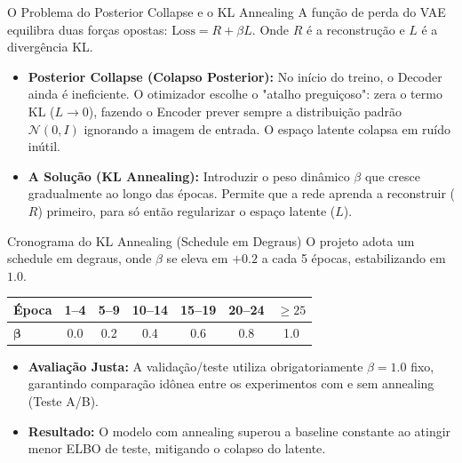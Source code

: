 \documentclass[10pt,aspectratio=169]{beamer}
\begin{document}
\begin{frame}{O Problema do Posterior Collapse e o KL Annealing}
    A função de perda do VAE equilibra duas forças opostas: $\text{Loss} = R + \beta L$. Onde $R$ é a reconstrução e $L$ é a divergência KL.
    \vspace{0.2cm}
    \begin{itemize}
        \item \textbf{Posterior Collapse (Colapso Posterior):} No início do treino, o Decoder ainda é ineficiente. O otimizador escolhe o "atalho preguiçoso": zera o termo KL ($L \to 0$), fazendo o Encoder prever sempre a distribuição padrão $\mathcal{N}(0, I)$ ignorando a imagem de entrada. O espaço latente colapsa em ruído inútil.
        \item \textbf{A Solução (KL Annealing):} Introduzir o peso dinâmico $\beta$ que cresce gradualmente ao longo das épocas. Permite que a rede aprenda a reconstruir ($R$) primeiro, para só então regularizar o espaço latente ($L$).
    \end{itemize}
\end{frame}

\begin{frame}{Cronograma do KL Annealing (Schedule em Degraus)}
    O projeto adota um schedule em degraus, onde $\beta$ se eleva em $+0.2$ a cada 5 épocas, estabilizando em $1.0$.
    \vspace{0.3cm}
    \begin{table}[]
        \centering
        \begin{tabular}{lcccccc}
            \toprule
            \textbf{Época} & 1--4 & 5--9 & 10--14 & 15--19 & 20--24 & $\ge 25$ \\
            \midrule
            $\boldsymbol{\beta}$ & 0.0 & 0.2 & 0.4 & 0.6 & 0.8 & 1.0 \\
            \bottomrule
        \end{tabular}
    \end{table}
    \vspace{0.2cm}
    \begin{itemize}
        \item \textbf{Avaliação Justa:} A validação/teste utiliza obrigatoriamente $\beta=1.0$ fixo, garantindo comparação idônea entre os experimentos com e sem annealing (Teste A/B).
        \item \textbf{Resultado:} O modelo com annealing superou a baseline constante ao atingir menor ELBO de teste, mitigando o colapso do latente.
    \end{itemize}
\end{frame}
\end{document}
